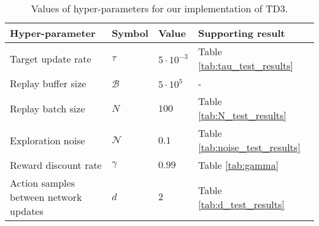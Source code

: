 
\begin{table}[htb!]
\centering
\small
\begin{tabularx}{0.95\textwidth}{RLLL} 
    \hline
    \textbf{Hyper-parameter} & \textbf{Symbol} & \textbf{Value} & \textbf{Supporting result} \\ 
    \hline
    Target update rate                      & $\tau$            & $5\cdot10^{-3}$       & Table \ref{tab:tau_test_results} \\
    Replay buffer size                      & $\mathcal{B}$     & $5\cdot 10^5$         & - \\
    Replay batch size                       & $N$               & $100$                 & Table \ref{tab:N_test_results} \\
    Exploration noise                       & $\mathcal{N}$     & $0.1$                 & Table \ref{tab:noise_test_results} \\
    Reward discount rate                    & $\gamma$          & $0.99$                & Table \ref{tab:gamma} \\
    Action samples between network updates  & $d$               & $2$                   & Table \ref{tab:d_test_results} \\
    \hline
\end{tabularx}
\caption[Values of hyper-parameters for our implementation of TD3]{Values of hyper-parameters for our implementation of TD3.}
\label{tab:algorithm_parameters}
\end{table}
